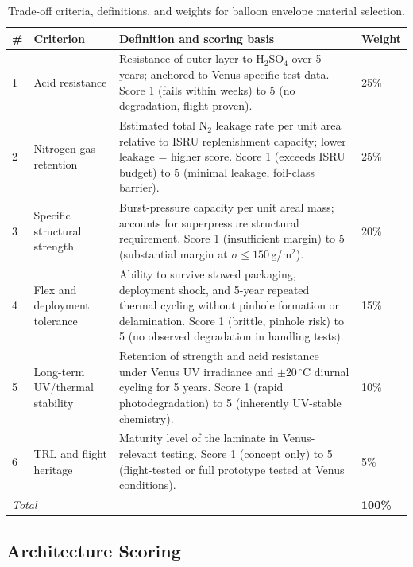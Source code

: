 \begin{table}[H]
\centering
\caption{Trade-off criteria, definitions, and weights for balloon envelope material selection.}
\label{tab:tradeoff-criteria}
\footnotesize
\renewcommand{\arraystretch}{1.15}
\setlength{\tabcolsep}{4pt}
\begin{tabularx}{\linewidth}{@{}p{0.4cm} p{3cm} X p{1.0cm}@{}}
\toprule
\textbf{\#} & \textbf{Criterion} & \textbf{Definition and scoring basis} & \textbf{Weight} \\
\midrule
1 & Acid resistance & Resistance of outer layer to H$_2$SO$_4$ over 5 years; anchored to Venus-specific test data. Score 1 (fails within weeks) to 5 (no degradation, flight-proven). & 25\% \\
2 & Nitrogen gas retention & Estimated total N$_2$ leakage rate per unit area relative to ISRU replenishment capacity; lower leakage = higher score. Score 1 (exceeds ISRU budget) to 5 (minimal leakage, foil-class barrier). & 25\% \\
3 & Specific structural \newline strength & Burst-pressure capacity per unit areal mass; accounts for superpressure structural requirement. Score 1 (insufficient margin) to 5 (substantial margin at $\sigma \leq 150$\,g/m$^2$). & 20\% \\
4 & Flex and deployment tolerance & Ability to survive stowed packaging, deployment shock, and 5-year repeated thermal cycling without pinhole formation or delamination. Score 1 (brittle, pinhole risk) to 5 (no observed degradation in handling tests). & 15\% \\
5 & Long-term UV/thermal stability & Retention of strength and acid resistance under Venus UV irradiance and $\pm$20\,$^\circ$C diurnal cycling for 5 years. Score 1 (rapid photodegradation) to 5 (inherently UV-stable chemistry). & 10\% \\
6 & TRL and flight \newline heritage & Maturity level of the laminate in Venus-relevant testing. Score 1 (concept only) to 5 (flight-tested or full prototype tested at Venus conditions). & 5\% \\
\midrule
\multicolumn{3}{l}{\textit{Total}} & \textbf{100\%} \\
\bottomrule
\end{tabularx}
\end{table}



\subsection{Architecture Scoring}
\label{ssec:tradeoff-scoring}


